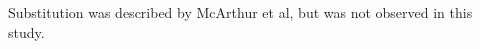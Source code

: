 \documentclass{report}
\begin{document}
\begin{table}[h]
	\centering
	\begin{ThreePartTable}

	\caption{Amino Acid Substitutions in the Hamster/P7 virus}

	\label{my-label}
	
	\begin{tablenotes}
	\item[a] Substitution was described by McArthur et al, but was not observed in this study.	
	\end{tablenotes}
	\end{ThreePartTable}
\end{table}
\end{document}
